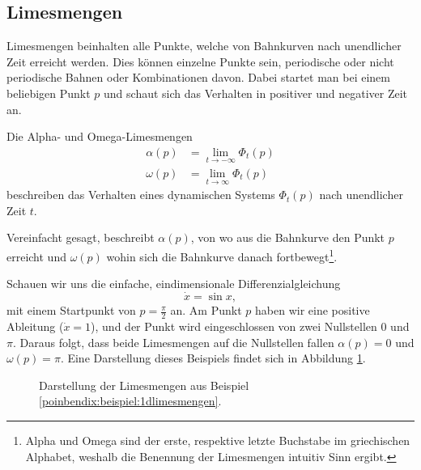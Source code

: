 \subsection{Limesmengen} \label{poinbendix:subsection:limesmengen}

Limesmengen beinhalten alle Punkte, welche von Bahnkurven nach unendlicher Zeit erreicht werden.
Dies können einzelne Punkte sein, periodische oder nicht periodische Bahnen oder Kombinationen davon.
Dabei startet man bei einem beliebigen Punkt $p$ und schaut sich das Verhalten in positiver und negativer Zeit an.

\begin{definition}[Limesmengen]
Die Alpha- und Omega-Limesmengen
\label{poinbendix:def:limesmengen}
\begin{align*}
    \alpha(p) &= \lim_{t\to-\infty} \Phi_t(p) \\
    \omega(p) &= \lim_{t\to\infty} \Phi_t(p)
\end{align*}
beschreiben das Verhalten eines dynamischen Systems $\Phi_t(p)$ nach unendlicher Zeit $t$.
\end{definition}

Vereinfacht gesagt, beschreibt $\alpha(p)$, von wo aus die Bahnkurve den Punkt $p$ erreicht und $\omega(p)$ wohin sich die Bahnkurve danach fortbewegt\footnote{Alpha und Omega sind der erste, respektive letzte Buchstabe im griechischen Alphabet, weshalb die Benennung der Limesmengen intuitiv Sinn ergibt.}.

\begin{beispiel} \label{poinbendix:beispiel:1dlimesmengen}
Schauen wir uns die einfache, eindimensionale Differenzialgleichung
\begin{equation*}
    \dot{x} = \sin x,
\end{equation*}
mit einem Startpunkt von $p = \frac{\pi}{2}$ an.
Am Punkt $p$ haben wir eine positive Ableitung ($\dot{x} = 1$), und der Punkt wird eingeschlossen von zwei Nullstellen $0$ und $\pi$.
Daraus folgt, dass beide Limesmengen auf die Nullstellen fallen $\alpha(p) = 0$ und $\omega(p) = \pi$.
Eine Darstellung dieses Beispiels findet sich in Abbildung \ref{poinbendix:fig:limesmenge}.
\begin{figure}
    \centering
    
    \caption{Darstellung der Limesmengen aus Beispiel \ref{poinbendix:beispiel:1dlimesmengen}.}
    \label{poinbendix:fig:limesmenge}
\end{figure}
\end{beispiel}
